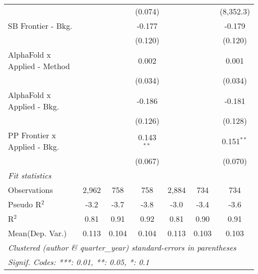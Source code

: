 \begin{tabular}{lcccccc}
                                &               &         & (0.074)       &               &             & (8,352.3)\\   
   SB Frontier - Bkg.           &               &         & -0.177        &               &             & -0.179\\   
                                &               &         & (0.120)       &               &             & (0.120)\\   
   AlphaFold x Applied - Method &               &         & 0.002         &               &             & 0.001\\   
                                &               &         & (0.034)       &               &             & (0.034)\\   
   AlphaFold x Applied - Bkg.   &               &         & -0.186        &               &             & -0.181\\   
                                &               &         & (0.126)       &               &             & (0.128)\\   
   PP Frontier x Applied - Bkg. &               &         & 0.143$^{**}$  &               &             & 0.151$^{**}$\\   
                                &               &         & (0.067)       &               &             & (0.070)\\   
   \midrule
   \emph{Fit statistics}\\
   Observations                 & 2,962         & 758     & 758           & 2,884         & 734         & 734\\  
   Pseudo R$^2$                 & -3.2          & -3.7    & -3.8          & -3.0          & -3.4        & -3.6\\  
   R$^2$                        & 0.81          & 0.91    & 0.92          & 0.81          & 0.90        & 0.91\\  
Mean(Dep. Var.) & 0.113 & 0.104 & 0.104 & 0.113 & 0.103 & 0.103 \\
   \midrule \midrule
   \multicolumn{7}{l}{\emph{Clustered (author \& quarter\_year) standard-errors in parentheses}}\\
   \multicolumn{7}{l}{\emph{Signif. Codes: ***: 0.01, **: 0.05, *: 0.1}}\\
\end{tabular}
\par\endgroup

